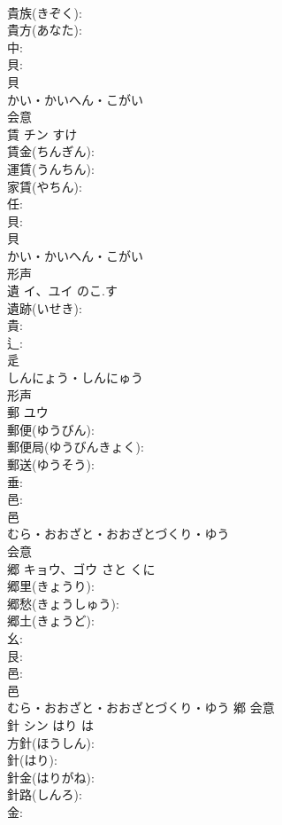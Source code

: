 \documentclass[8pt]{extreport}
\begin{document}
\begin{CJK}{UTF8}{min}
\\	貴族(きぞく): 
\\	貴方(あなた): 
\\	中: 
\\	貝: 
\\	貝	
\\	かい・かいへん・こがい	
\\	会意 
\\	賃	チン		すけ	
\\	賃金(ちんぎん): 
\\	運賃(うんちん): 
\\	家賃(やちん): 
\\	任: 
\\	貝: 
\\	貝	
\\	かい・かいへん・こがい	
\\	形声 
\\	遺	イ、ユイ	のこ.す		
\\	遺跡(いせき): 
\\	貴: 
\\	辶: 
\\	辵	
\\	しんにょう・しんにゅう	
\\	形声 
\\	郵	ユウ			
\\	郵便(ゆうびん): 
\\	郵便局(ゆうびんきょく): 
\\	郵送(ゆうそう): 
\\	垂: 
\\	邑: 
\\	邑	
\\	むら・おおざと・おおざとづくり・ゆう	
\\	会意 
\\	郷	キョウ、ゴウ	さと	くに	
\\	郷里(きょうり): 
\\	郷愁(きょうしゅう): 
\\	郷土(きょうど): 
\\	幺: 
\\	艮: 
\\	邑: 
\\	邑	
\\	むら・おおざと・おおざとづくり・ゆう	鄕	会意 
\\	針	シン	はり	は	
\\	方針(ほうしん): 
\\	針(はり): 
\\	針金(はりがね): 
\\	針路(しんろ): 
\\	金: 

\end{CJK}
\end{document}
